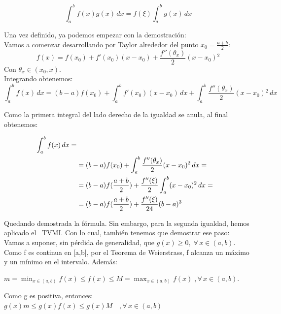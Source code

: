 \documentclass{article}
\begin{document}
			\begin{equation}
				\int_{a}^{b} f(x)g(x) \,dx =f(\xi)\int_{a}^{b} g(x) \,dx 
			\end{equation}
			
			Una vez definido, ya podemos empezar con la demostración: \\

			Vamos a comenzar desarrollando por Taylor alrededor del punto
			$x_0=\frac{a+b}{2}$:
			\begin{equation}
				f(x)=f(x_0)+f'(x_0)(x-x_0)+\frac{f''(\theta_x)}{2}(x-x_0){^2} 
			\end{equation}
			Con $\theta_x \in (x_0,x)$. \\

			Integrando obtenemos: 
			\begin{equation}
				\int_{a}^{b} f(x) \,dx=(b-a)f(x_0)+\int_{a}^{b} f'(x_0)(x-x_0) \,dx+\int_{a}^{b} \frac{f''(\theta_x)}{2} (x-x_0){^2} \,dx       
			\end{equation}
			
			Como la primera integral del lado derecho de la igualdad se anula, al final obtenemos:
			
			\begin{align}
				\int_{a}^{b} f(x) \,dx= \notag \\
				&=(b-a)f(x_0)+\int_{a}^{b} \frac{f''(\theta_x)}{2} (x-x_0){^2} \,dx= \notag \\
				&=(b-a)f(\frac{a+b}{2})+\frac{f''(\xi)}{2}\int_{a}^{b} (x-x_0){^2} \,dx= \notag \\
				&=(b-a)f(\frac{a+b}{2})+\frac{f''(\xi)}{24}(b-a){^3} 
			\end{align}
			
			Quedando demostrada la fórmula. Sin embargo,  para la segunda igualdad, hemos aplicado el ~TVMI. Con lo cual, también tenemos que demostrar ese paso: \\

			Vamos a suponer, sin pérdida de generalidad, que 
			$g(x)\geq 0,\;\forall\, x \in (a,b)$. \\

			Como f es continua en [a,b], por el Teorema de Weierstrass, f alcanza un máximo y un mínimo en el intervalo. Además:

	\begin{center}
	$m =\min_{x \in (a,b)}f(x) \leq f(x) \leq M =\max_{x \in (a,b)}f(x) \;, \forall\, x \in (a,b)$.
	\end{center}
			
			Como g es positiva, entonces:
			$g(x)m \leq g(x)f(x) \leq g(x)M\quad ,\forall\, x \in (a,b)$ \\
\end{document}
